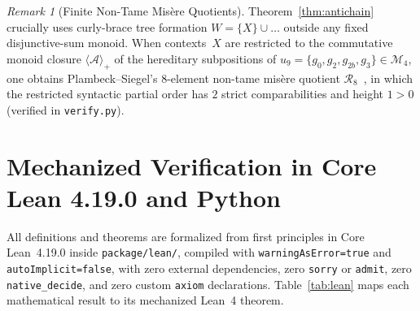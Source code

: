 \documentclass[11pt]{amsart}
\theoremstyle{definition}
\theoremstyle{remark}
\newtheorem{remark}[theorem]{Remark}
\newcommand{\Mlayer}{\mathcal{M}}
\begin{document}
\begin{remark}[Finite Non-Tame Mis\`ere Quotients]
\label{rem:quotient}
Theorem~\ref{thm:antichain} crucially uses curly-brace tree formation $W = \{X\} \cup \dots$ outside any fixed disjunctive-sum monoid. When contexts~$X$ are restricted to the commutative monoid closure $\langle \mathcal{A} \rangle_+$ of the hereditary subpositions of $u_9 = \{g_0, g_2, g_{2b}, g_3\} \in \Mlayer_4$, one obtains Plambeck--Siegel's $8$-element non-tame mis\`ere quotient $\mathcal{R}_8$~\cite[Example~5.4]{SiegelCGT}, in which the restricted syntactic partial order has $2$ strict comparabilities and height $1 > 0$ (verified in \texttt{verify.py}).
\end{remark}

\section{Mechanized Verification in Core Lean 4.19.0 and Python}

All definitions and theorems are formalized from first principles in Core Lean~4.19.0 inside \texttt{package/lean/}, compiled with \texttt{warningAsError=true} and \texttt{autoImplicit=false}, with zero external dependencies, zero \texttt{sorry} or \texttt{admit}, zero \texttt{native\_decide}, and zero custom \texttt{axiom} declarations. Table~\ref{tab:lean} maps each mathematical result to its mechanized Lean~4 theorem.
\end{document}
